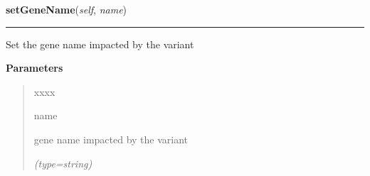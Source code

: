     \label{script-FixedVar:var:setGeneName}

    \vspace{0.5ex}

\hspace{.8\funcindent}\begin{boxedminipage}{\funcwidth}

    \raggedright \textbf{setGeneName}(\textit{self}, \textit{name})

    \vspace{-1.5ex}

    \rule{\textwidth}{0.5\fboxrule}
\setlength{\parskip}{2ex}
    Set the gene name impacted by the variant

\setlength{\parskip}{1ex}
      \textbf{Parameters}
      \vspace{-1ex}

      \begin{quote}
        \begin{Ventry}{xxxx}

          \item[name]

          gene name impacted by the variant

            {\it (type=string)}

        \end{Ventry}

      \end{quote}

    \end{boxedminipage}

    \label{script-FixedVar:var:setTranscritID}

    \vspace{0.5ex}

